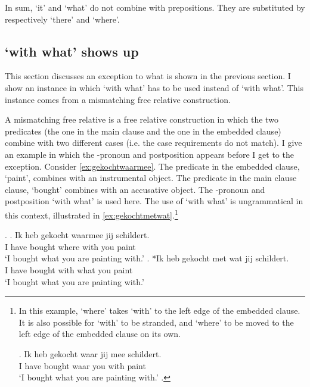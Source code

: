 \documentclass[12pt]{article}
\begin{document}
In sum,  `it' and  `what' do not combine with prepositions. They are substituted by respectively  `there' and  `where'.


\subsection{ `with what' shows up}

This section discusses an exception to what is shown in the previous section. I show an instance in which  `with what' has to be used instead of  `with what'. This instance comes from a mismatching free relative construction.

A mismatching free relative is a free relative construction in which the two predicates (the one in the main clause and the one in the embedded clause) combine with two different cases (i.e. the case requirements do not match). I give an example in which the -pronoun and postposition appears before I get to the exception. Consider \ref{ex:gekochtwaarmee}. The predicate in the embedded clause,  `paint', combines with an instrumental object. The predicate in the main clause clause,  `bought' combines with an accusative object. The -pronoun and postposition  `with what' is used here. The use of  `with what' is ungrammatical in this context, illustrated in \ref{ex:gekochtmetwat}.\footnote{In this example,  `where' takes  `with' to the left edge of the embedded clause. It is also possible for  `with' to be stranded, and  `where' to be moved to the left edge of the embedded clause on its own.

\exg. Ik heb gekocht waar jij mee schildert.\\
 I have bought waar you with paint\\
 `I bought what you are painting with.'\label{ex:meealong}
\z.

\phantom{x}
}

\ex.
\ag. Ik heb gekocht waarmee jij schildert.\\
 I have bought {where with} you paint\\
 `I bought what you are painting with.'\label{ex:gekochtwaarmee}
\bg. *Ik heb gekocht met wat jij schildert.\\
 I have bought with what you paint\\
 `I bought what you are painting with.'\label{ex:gekochtmetwat}
\end{document}
